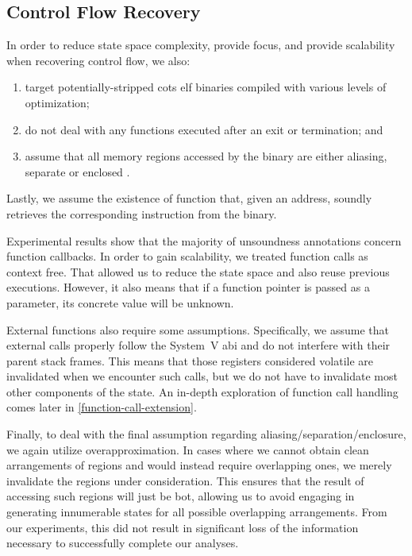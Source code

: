 \subsection{Control Flow Recovery}\label{cfr-assumptions}
In order to reduce state space complexity, provide focus, and provide scalability when recovering control flow, we also:
\begin{enumerate}
  \item target potentially-stripped \gls{cots} \gls{elf} binaries compiled with various levels of optimization;
  \item do not deal with any functions executed after an exit or termination; and
  \item assume that all memory regions accessed by the binary are either aliasing, separate or enclosed \autocite{balakrishnan2004analyzing,balakrishnan2005codesurfer}.
\end{enumerate}
Lastly, we assume the existence of  function that, given an address, soundly retrieves the corresponding instruction from the binary.

Experimental results show that the majority of unsoundness annotations concern function callbacks.
In order to gain scalability, we treated function calls as context free.
That allowed us to reduce the state space and also reuse previous executions.
However, it also means that if a function pointer is passed as a parameter, its concrete value will be unknown.

External functions also require some assumptions.
Specifically, we assume that external calls properly follow the System~V \gls{abi} and do not interfere with their parent stack frames.
This means that those registers considered volatile are invalidated when we encounter such calls, but we do not have to invalidate most other components of the state.
An in-depth exploration of function call handling comes later in \cref{function-call-extension}.

Finally, to deal with the final assumption regarding aliasing/separation/enclosure, we again utilize overapproximation.
In cases where we cannot obtain clean arrangements of regions and would instead require overlapping ones, we merely invalidate the regions under consideration.
This ensures that the result of accessing such regions will just be \gls{bot}, allowing us to avoid engaging in generating innumerable states for all possible overlapping arrangements.
From our experiments, this did not result in significant loss of the information necessary to successfully complete our analyses.

